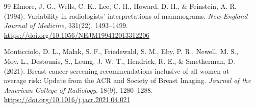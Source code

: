 \begin{thebibliography}{99}
    Elmore, J. G., Wells, C. K., Lee, C. H., Howard, D. H., \& Feinstein, A. R. (1994).
    Variability in radiologists' interpretations of mammograms.
    \textit{New England Journal of Medicine}, 331(22), 1493--1499.
    \url{https://doi.org/10.1056/NEJM199412013312206}

    Monticciolo, D. L., Malak, S. F., Friedewald, S. M., Eby, P. R., Newell, M. S., Moy, L.,
    Destounis, S., Leung, J. W. T., Hendrick, R. E., \& Smetherman, D. (2021).
    Breast cancer screening recommendations inclusive of all women at average risk: Update from the ACR and Society of Breast Imaging.
    \textit{Journal of the American College of Radiology}, 18(9), 1280--1288.
    \url{https://doi.org/10.1016/j.jacr.2021.04.021}
\end{thebibliography}
